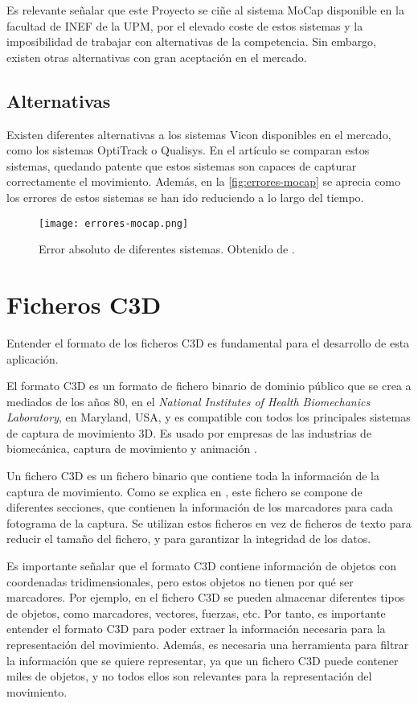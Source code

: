 Es relevante señalar que este Proyecto se ciñe al sistema \ac{MoCap} disponible en la facultad de INEF de la \ac{UPM}, por el elevado coste de estos sistemas y la imposibilidad de trabajar con alternativas de la competencia. Sin embargo, existen otras alternativas con gran aceptación en el mercado.

\subsection{Alternativas}
Existen diferentes alternativas a los sistemas Vicon disponibles en el mercado, como los sistemas OptiTrack o Qualisys. En el artículo \autocite{article} se comparan estos sistemas, quedando patente que estos sistemas son capaces de capturar correctamente el movimiento. Además, en la \autoref{fig:errores-mocap} se aprecia como los errores de estos sistemas se han ido reduciendo a lo largo del tiempo.

\begin{figure}[H]
    \centering
    \texttt{[image: errores-mocap.png]}
    \caption{Error absoluto de diferentes sistemas. Obtenido de \autocite{article}.}
    \label{fig:errores-mocap}
\end{figure}

\section{Ficheros \acs{C3D}} \label{sec:ficheros-c3d}
Entender el formato de los ficheros \ac{C3D} es fundamental para el desarrollo de esta aplicación. 

El formato \ac{C3D} es un formato de fichero binario de dominio público que se crea a mediados de los años 80, en el \textit{National Institutes of Health Biomechanics Laboratory}, en Maryland, USA, y es compatible con todos los principales sistemas de captura de movimiento 3D. Es usado por empresas de las industrias de biomecánica, captura de movimiento y animación \autocite{C3DORGBiomechanicsStandard}.

Un fichero \ac{C3D} es un fichero binario que contiene toda la información de la captura de movimiento. Como se explica en \autocite{C3DORGBiomechanicsStandard}, este fichero se compone de diferentes secciones, que contienen la información de los marcadores para cada fotograma de la captura. Se utilizan estos ficheros en vez de ficheros de texto para reducir el tamaño del fichero, y para garantizar la integridad de los datos.

Es importante señalar que el formato \ac{C3D} contiene información de objetos con coordenadas tridimensionales, pero estos objetos no tienen por qué ser marcadores. Por ejemplo, en el fichero \ac{C3D} se pueden almacenar diferentes tipos de objetos, como marcadores, vectores, fuerzas, etc. Por tanto, es importante entender el formato \ac{C3D} para poder extraer la información necesaria para la representación del movimiento. Además, es necesaria una herramienta para filtrar la información que se quiere representar, ya que un fichero \ac{C3D} puede contener miles de objetos, y no todos ellos son relevantes para la representación del movimiento.

